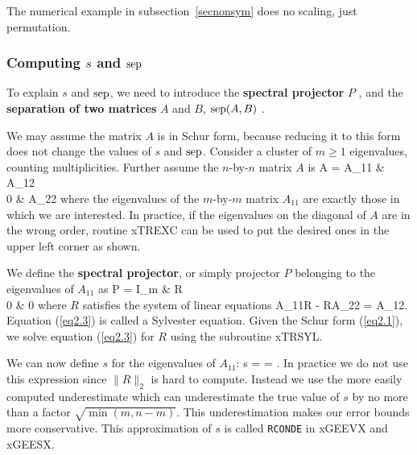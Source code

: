 The numerical example in subsection~\ref{secnonsym} does no scaling,
just permutation.

\subsubsection{Computing $s$ and ${\rm sep}$}\label{secspec}

To explain $s$ and ${\rm sep}$, we need to
introduce
the {\bf spectral projector} $P$ \cite{stewart73,kato}, and the
{\bf separation of two matrices}
$A$ and $B$, ${\rm sep} (A,B)$ \cite{stewart73,varah}.

We may assume the matrix $A$ is in Schur form, because reducing it
to this form does not change the values of $s$ and ${\rm sep}$.
Consider a cluster of $m \geq 1$ eigenvalues, counting multiplicities.
Further assume the $n$-by-$n$ matrix $A$ is
\bq\label{eq2.1}
A  =  A_{11} & A_{12} \\ 0 & A_{22} \emat
\eq
where the eigenvalues of the $m$-by-$m$ matrix
$A_{11}$ are exactly those in which we are
interested. In practice, if the eigenvalues on the diagonal of $A$
are in the wrong order, routine xTREXC
can be used to put the desired ones in the upper left corner
as shown.

We define the {\bf spectral projector}, or simply projector $P$ belonging
to the eigenvalues of $A_{11}$ as
\bq\label{eq2.2}
P =  I_m & R \\ 0 & 0 \emat
\eq
where $R$ satisfies the system of linear equations
\bq\label{eq2.3}
A_{11}R - RA_{22} = A_{12}.
\eq
Equation (\ref{eq2.3}) is called a Sylvester equation.
Given the Schur form (\ref{eq2.1}), we solve equation
(\ref{eq2.3}) for $R$ using the subroutine xTRSYL.

We can now define $s$ for the eigenvalues of $A_{11}$:
\bq
s =  = .
\eq
In practice we do not use this expression since $\|R\|_2$ is hard to
compute. Instead we use the more easily computed underestimate
\bq
{}
\eq
which can underestimate the true value of $s$ by no more than a factor
$\sqrt { \min ( m,n-m ) }$.
This underestimation makes our error bounds more conservative.
This approximation of $s$ is called {\tt RCONDE} in xGEEVX and xGEESX.

